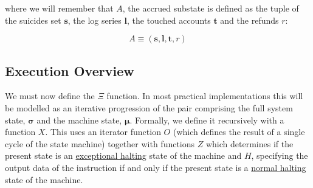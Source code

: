 \documentclass[9pt,oneside]{amsart}
\begin{document}
\begin{multicols}{2}
where we will remember that $A$, the accrued substate is defined as the tuple of the suicides set $\mathbf{s}$, the log series $\mathbf{l}$, the touched accounts $\mathbf{t}$ and the refunds $r$:

\begin{equation}
A \equiv (\mathbf{s}, \mathbf{l}, \mathbf{t}, r)
\end{equation}

\subsection{Execution Overview}

We must now define the $\Xi$ function. In most practical implementations this will be modelled as an iterative progression of the pair comprising the full system state, $\boldsymbol{\sigma}$ and the machine state, $\boldsymbol{\mu}$. Formally, we define it recursively with a function $X$. This uses an iterator function $O$ (which defines the result of a single cycle of the state machine) together with functions \hyperlink{zhalt}{$Z$} which determines if the present state is an \hyperlink{zhalt}{exceptional halting} state of the machine and \hyperlink{hhalt}{$H$}, specifying the output data of the instruction if and only if the present state is a \hyperlink{hhalt}{normal halting} state of the machine.


\end{multicols}
\end{document}

